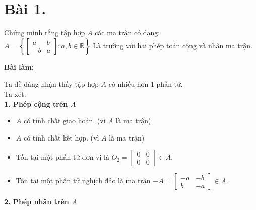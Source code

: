 \section*{Bài 1.}

Chứng minh rằng tập hợp $A$ các ma trận có dạng:\\[6pt]
$A = \left\{ \begin{bmatrix}
a & b\\[-6pt]
-b & a
\end{bmatrix}: a, b \in \mathbb{R} \right\}$
Là trường với hai phép toán cộng và nhân ma trận.


\centering
\textbf{\underline{Bài làm:}}

\justifying
Ta dễ dàng nhận thấy tập hợp $A$ có nhiều hơn 1 phần tử.\\
Ta xét:\\
\textbf{1. Phép cộng trên $A$}
\begin{itemize}[itemsep=-6pt, noitemsep,topsep=0pt]
    \item $A$ có tính chất giao hoán. (vì $A$ là ma trận)
    \item $A$ có tính chất kết hợp. (vì $A$ là ma trận)
    \item Tồn tại một phần tử đơn vị là $O_2 = \begin{bmatrix}
    0 & 0\\[-6pt]
    0 & 0\end{bmatrix} \in A$.
    \item Tồn tại một phần tử nghịch đảo là ma trận $-A = \begin{bmatrix}
-a & -b\\[-6pt]
b & -a
\end{bmatrix} \in A$.
\end{itemize}
\textbf{2. Phép nhân trên $A$}
